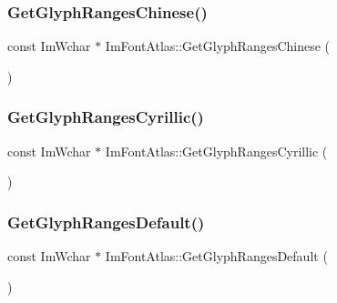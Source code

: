 \hypertarget{struct_im_font_atlas_afc5807dd42b3a644a9a1e0a95c13cb08}{}\label{struct_im_font_atlas_afc5807dd42b3a644a9a1e0a95c13cb08} 
\subsubsection{\texorpdfstring{Get\+Glyph\+Ranges\+Chinese()}{GetGlyphRangesChinese()}}
{\footnotesize\ttfamily const Im\+Wchar $\ast$ Im\+Font\+Atlas\+::\+Get\+Glyph\+Ranges\+Chinese (\begin{DoxyParamCaption}{ }\end{DoxyParamCaption})}

\hypertarget{struct_im_font_atlas_a5aaff3357d9ed401ce451c39942e869e}{}\label{struct_im_font_atlas_a5aaff3357d9ed401ce451c39942e869e} 
\subsubsection{\texorpdfstring{Get\+Glyph\+Ranges\+Cyrillic()}{GetGlyphRangesCyrillic()}}
{\footnotesize\ttfamily const Im\+Wchar $\ast$ Im\+Font\+Atlas\+::\+Get\+Glyph\+Ranges\+Cyrillic (\begin{DoxyParamCaption}{ }\end{DoxyParamCaption})}

\hypertarget{struct_im_font_atlas_adec0df140eb1dc01c2a22a5253d62820}{}\label{struct_im_font_atlas_adec0df140eb1dc01c2a22a5253d62820} 
\subsubsection{\texorpdfstring{Get\+Glyph\+Ranges\+Default()}{GetGlyphRangesDefault()}}
{\footnotesize\ttfamily const Im\+Wchar $\ast$ Im\+Font\+Atlas\+::\+Get\+Glyph\+Ranges\+Default (\begin{DoxyParamCaption}{ }\end{DoxyParamCaption})}

\hypertarget{struct_im_font_atlas_a2654afbbf73835bf08278cdc6c181a96}{}\label{struct_im_font_atlas_a2654afbbf73835bf08278cdc6c181a96} 
